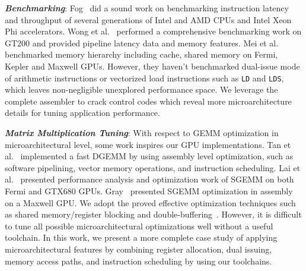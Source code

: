 {\em {\bf Benchmarking}}: 
Fog~\cite{fog} did a sound work on benchmarking instruction latency and throughput of several generations of Intel and AMD CPUs and Intel Xeon Phi accelerators. %
Wong et al.~\cite{wong} performed a 
comprehensive benchmarking work on GT200 and provided pipeline latency data and
memory features. Mei et al.~\cite{mei} benchmarked memory hierarchy including cache, shared memory on Fermi, Kepler and Maxwell GPUs.
However, they haven't benchmarked dual-issue mode of arithmetic instructions or vectorized load instructions such as {\tt LD} and {\tt LDS}, which leaves non-negligible unexplored performance space. 
We leverage the complete assembler to crack control codes which reveal more microarchitecture details for tuning application performance.

{\em {\bf Matrix Multiplication Tuning}}: 
With respect to GEMM optimization in microarchitectural level, some work inspires our GPU implementations. 
Tan et al.~\cite{tan} implemented a fast DGEMM by using 
assembly level optimization, such as software pipelining, vector memory operations, and instruction scheduling. 
Lai et al.~\cite{lai} presented performance analysis and optimization work of SGEMM on both Fermi and GTX680 GPUs. 
Gray~\cite{nervana_sgemm_wiki} presented SGEMM optimization in assembly on a Maxwell GPU. 
We adopt the proved effective optimization techniques such as shared memory/register 
blocking and double-buffering~\cite{volkov,tan}.
However, it is difficult to tune all possible microarchitectural optimizations well without a useful toolchain.
In this work, we present a more complete case study of applying microarchitectural features by combining 
register allocation, dual issuing, memory access paths, and instruction scheduling by using our toolchains.
